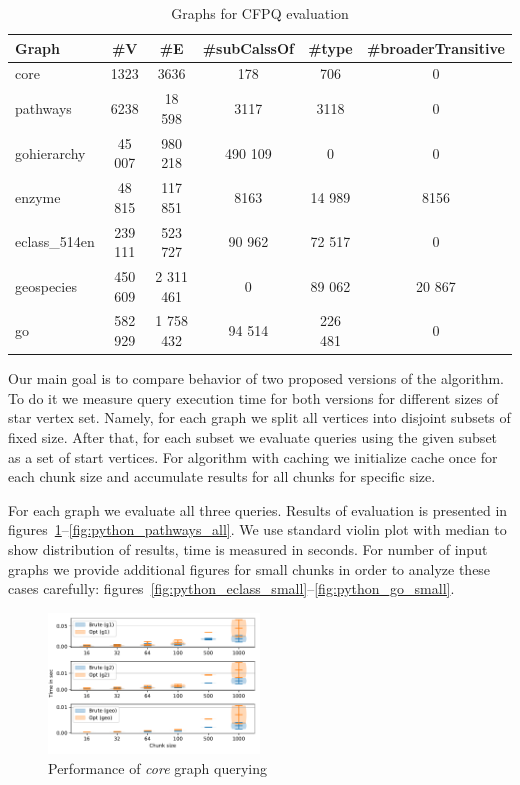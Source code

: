 {\setlength{\tabcolsep}{0.2em}
\begin{table}
{
\caption{Graphs for CFPQ evaluation}
\label{tbl:graphs_for_cfpq}
\small
{}
\begin{tabular}{|l|c|c|c|c|c|}
\hline
Graph          & \#V       & \#E        & \#subCalssOf & \#type &\#broaderTransitive\\
\hline
\hline
core                        & 1323     & 3636       & 178       & 706      & 0      \\ 
pathways                    & 6238     & 18 598     & 3117      & 3118     & 0      \\ 
gohierarchy                 & 45 007   & 980 218    & 490 109   & 0        & 0      \\ 
enzyme                      & 48 815   & 117 851    & 8163      & 14 989   & 8156   \\ 
eclass\_514en               & 239 111  & 523 727    & 90 962    & 72 517   & 0      \\ 
geospecies                  & 450 609  & 2 311 461  & 0         & 89 062   & 20 867 \\
go                          & 582 929  & 1 758 432  & 94 514    & 226 481  & 0      \\ 
\hline
\end{tabular}
}
\end{table}
}


Our main goal is to compare behavior of two proposed versions of the algorithm.
To do it we measure query execution time for both versions for different sizes of star vertex set. 
Namely, for each graph we split all vertices into disjoint subsets of fixed size.
After that, for each subset we evaluate queries using the given subset as a set of start vertices. 
For algorithm with caching we initialize cache once for each chunk size and accumulate results for all chunks for specific size.

For each graph we evaluate all three queries. 
Results of evaluation is presented in figures~\ref{fig:python_core_all}--\ref{fig:python_pathways_all}.
We use standard violin plot with median to show distribution of results, time is measured in seconds.
For number of input graphs we provide additional figures for small chunks in order to analyze these cases carefully: figures~\ref{fig:python_eclass_small}--\ref{fig:python_go_small}.

\begin{figure}[h]
\centering
\includegraphics[width=0.5\textwidth]{data/raw/core.pdf}
\caption{Performance of \textit{core} graph querying}
\label{fig:python_core_all}
\end{figure}

